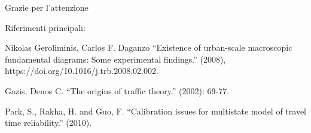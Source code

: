 \documentclass[
	11pt, %
]{beamer}
\begin{document}

\begin{frame}[plain] %
	\begin{center}
		{\Huge Grazie per l'attenzione}
		
		\bigskip\bigskip %
		
		{\LARGE Riferimenti principali:}
		
		\bigskip
		\small

		Nikolas Geroliminis, Carlos F. Daganzo ``Existence of urban-scale macroscopic fundamental diagrams: Some experimental findings.'' (2008), https://doi.org/10.1016/j.trb.2008.02.002.
		
		\bigskip
		
		Gazis, Denos C. ``The origins of traffic theory.'' (2002): 69-77.
		
		\bigskip
		
		Park, S., Rakha, H. and Guo, F. ``Calibration issues for multistate model of travel time reliability.'' (2010).
	\end{center}
\end{frame}
\end{document}
